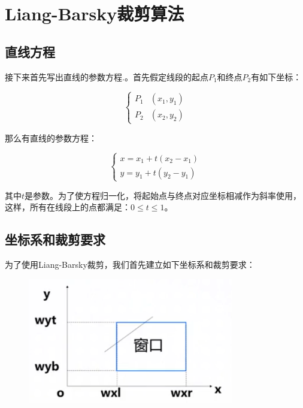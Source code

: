 \section{Liang-Barsky裁剪算法}

\subsection{直线方程}

接下来首先写出直线的参数方程.。首先假定线段的起点$P_1$和终点$P_2$有如下坐标：

\begin{equation}
\begin{cases}
P_1 & (x_1, y_1) \\
P_2 & (x_2, y_2)
\end{cases}
\end{equation}

那么有直线的参数方程：

\begin{equation}
\begin{cases}
x = x_1+t(x_2-x_1) \\
y = y_1+t(y_2-y_1) 
\end{cases}
\end{equation}

其中$t$是参数。为了使方程归一化，将起始点与终点对应坐标相减作为斜率使用，这样，所有在线段上的点都满足：$0 \leq t \leq 1$。

\subsection{坐标系和裁剪要求}

为了使用Liang-Barsky裁剪，我们首先建立如下坐标系和裁剪要求：

\begin{figure}[H]
\centering
\includegraphics[width=0.8\textwidth,keepaspectratio]{imgs/lb-clip-co.png}
\end{figure}
 
